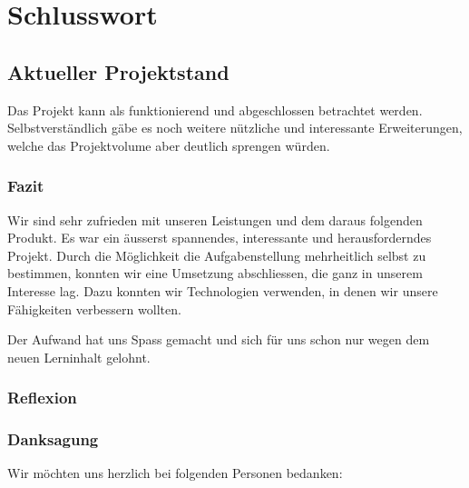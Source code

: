 
\chapter{Schlusswort}
\label{chap:Schlusswort}
\section{Aktueller Projektstand}
Das Projekt kann als funktionierend und abgeschlossen betrachtet werden. Selbstverständlich gäbe es noch weitere nützliche und interessante Erweiterungen, welche das Projektvolume aber deutlich sprengen würden.

\subsection{Fazit}
Wir sind sehr zufrieden mit unseren Leistungen und dem daraus folgenden Produkt. Es war ein äusserst spannendes, interessante und herausforderndes Projekt. Durch die Möglichkeit die Aufgabenstellung mehrheitlich selbst zu bestimmen, konnten wir eine Umsetzung abschliessen, die ganz in unserem Interesse lag. Dazu konnten wir Technologien verwenden, in denen wir unsere Fähigkeiten verbessern wollten.

Der Aufwand hat uns Spass gemacht und sich für uns schon nur wegen dem neuen Lerninhalt gelohnt.





\subsection{Reflexion}



\subsection{Danksagung}
Wir möchten uns herzlich bei folgenden Personen bedanken:\\
\vspace{0.5cm}

